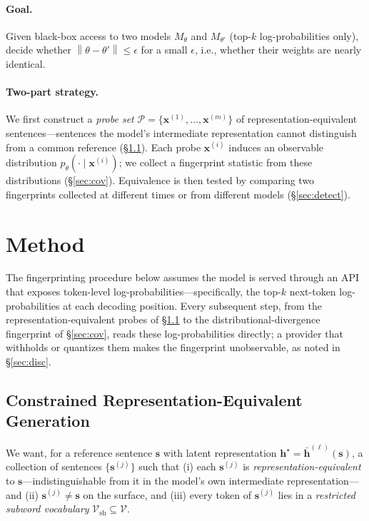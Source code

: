 \documentclass[11pt]{article}
\newcommand{\V}{\mathcal{V}}
\newcommand{\Vsh}{\mathcal{V}_{\mathrm{sh}}}
\newcommand{\norm}[1]{\left\lVert #1 \right\rVert}
\theoremstyle{definition}
\begin{document}
\paragraph{Goal.}
Given black-box access to two models $M_\theta$ and $M_{\theta'}$ (top-$k$
log-probabilities only), decide whether $\norm{\theta - \theta'} \le \epsilon$
for a small $\epsilon$, i.e., whether their weights are nearly identical.

\paragraph{Two-part strategy.}
We first construct a \emph{probe set} $\mathcal{P} = \{\bm{x}^{(1)},
\dots, \bm{x}^{(m)}\}$ of representation-equivalent sentences---sentences the
model's intermediate representation cannot distinguish from a common reference
(\S\ref{sec:syn}). Each probe
$\bm{x}^{(i)}$ induces an observable distribution $p_\theta(\cdot \mid
\bm{x}^{(i)})$; we collect a fingerprint statistic from these distributions
(\S\ref{sec:cov}). Equivalence is then tested by comparing two fingerprints
collected at different times or from different models (\S\ref{sec:detect}).

\section{Method}
\label{sec:method}

The fingerprinting procedure below assumes the model is served through an API
that exposes token-level log-probabilities---specifically, the top-$k$ next-token
log-probabilities at each decoding position. Every subsequent step, from the
representation-equivalent probes of \S\ref{sec:syn} to the distributional-divergence
fingerprint of \S\ref{sec:cov}, reads these log-probabilities directly; a provider that
withholds or quantizes them makes the fingerprint unobservable, as noted in
\S\ref{sec:disc}.

\subsection{Constrained Representation-Equivalent Generation}
\label{sec:syn}

We want, for a reference sentence $\bm{s}$ with latent representation
$\bm{h}^\star = \bar{\bm{h}}^{(\ell)}(\bm{s})$, a collection of sentences
$\{\bm{s}^{(j)}\}$ such that (i) each $\bm{s}^{(j)}$ is
\emph{representation-equivalent} to $\bm{s}$---indistinguishable from it in the
model's own intermediate representation---and (ii) $\bm{s}^{(j)} \ne \bm{s}$ on
the surface, and (iii) every token of $\bm{s}^{(j)}$ lies in a
\emph{restricted subword vocabulary} $\Vsh \subseteq \V$.
\end{document}
